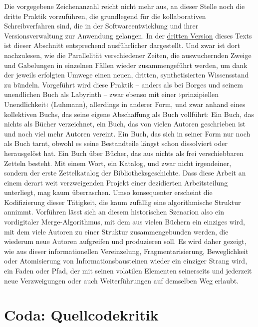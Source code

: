 \documentclass[a4paper,11pt]{article}
\newcommand{\inanf}[1]{›#1‹}
\begin{document}
Die vorgegebene Zeichenanzahl reicht nicht mehr aus, an dieser Stelle noch die dritte Praktik vorzuführen, die grundlegend für die kollaborativen Schreibverfahren sind, die in der Softwareentwicklung und ihrer Versionsverwaltung zur Anwendung gelangen. In der \href{https://github.com/nachsommer/VersionsKontrolle/blob/master/3.Fassung/Assistenzsysteme.pdf}{dritten Version} dieses Texts ist dieser Abschnitt entsprechend ausführlicher dargestellt. Und zwar ist dort nachzulesen, wie die Parallelität verschiedener Zeiten, die auswuchernden Zweige und Gabelungen in einzelnen Fällen wieder zusammengeführt werden, um dank der jeweils erfolgten Umwege einen neuen, dritten, synthetisierten Wissensstand zu bündeln. Vorgeführt wird diese Praktik – anders als bei Borges und seinem unendlichen Buch als Labyrinth – zwar ebenso mit einer \inanf{prinzipiellen Unendlichkeit} (Luhmann), allerdings in anderer Form, und zwar anhand eines kollektiven Buchs, das seine eigene Abschaffung als Buch vollführt: Ein Buch, das nichts als Bücher verzeichnet, ein Buch, das von vielen Autoren geschrieben ist und noch viel mehr Autoren vereint. Ein Buch, das sich in seiner Form nur noch als Buch tarnt, obwohl es seine Bestandteile längst schon dissolviert oder herausgelöst hat. Ein Buch über Bücher, das aus nichts als frei verschiebbaren Zetteln besteht. Mit einem Wort, ein Katalog, und zwar nicht irgendeiner, sondern der erste Zettelkatalog der Bibliotheksgeschichte. Dass diese Arbeit an einem derart weit verzweigenden Projekt einer dezidierten Arbeitsteilung unterliegt, mag kaum überraschen. Umso konsequenter erscheint die Kodifizierung dieser Tätigkeit, die kaum zufällig eine algorithmische Struktur annimmt. Vorführen lässt sich an diesem historischen Szenarion also ein vordigitaler Merge-Algorithmus, mit dem aus vielen Büchern ein einziges wird, mit dem viele Autoren zu einer Struktur zusammengebunden werden, die wiederum neue Autoren aufgreifen und produzieren soll. Es wird daher gezeigt, wie aus dieser informationellen Vereinzelung, Fragmentarisierung, Beweglichkeit oder Atomisierung von Informationsbausteinen wieder ein einziger Strang wird, ein Faden oder Pfad, der mit seinen volatilen Elementen seinerseits und jederzeit neue Verzweigungen oder auch Weiterführungen auf demselben Weg erlaubt.


\section*{Coda: Quellcodekritik}
\end{document}
